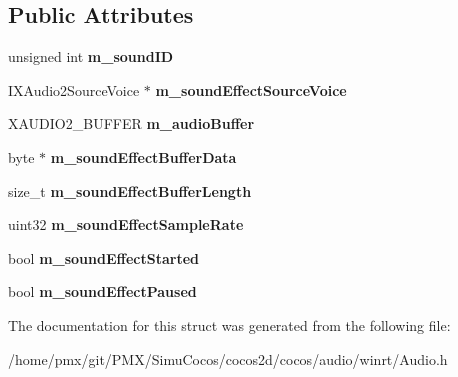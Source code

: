 \subsection*{Public Attributes}
\begin{DoxyCompactItemize}
\item 
\mbox{\label{structSoundEffectData_a1ca36290fb1d20f921a185ddafa4c417}} 
unsigned int {\bfseries m\+\_\+sound\+ID}
\item 
\mbox{\label{structSoundEffectData_ae47aef944a442e08e9ea49ed9feac623}} 
I\+X\+Audio2\+Source\+Voice $\ast$ {\bfseries m\+\_\+sound\+Effect\+Source\+Voice}
\item 
\mbox{\label{structSoundEffectData_ab70a06fe6593dbc7db84555f27c5dcc1}} 
X\+A\+U\+D\+I\+O2\+\_\+\+B\+U\+F\+F\+ER {\bfseries m\+\_\+audio\+Buffer}
\item 
\mbox{\label{structSoundEffectData_a8cd590aef163bdf4feb5b9d29622f5d2}} 
byte $\ast$ {\bfseries m\+\_\+sound\+Effect\+Buffer\+Data}
\item 
\mbox{\label{structSoundEffectData_a3d1b28963669ccfe8423dd8e45963d30}} 
size\+\_\+t {\bfseries m\+\_\+sound\+Effect\+Buffer\+Length}
\item 
\mbox{\label{structSoundEffectData_abb7c6cf13d223a01808b524a8e1965d4}} 
uint32 {\bfseries m\+\_\+sound\+Effect\+Sample\+Rate}
\item 
\mbox{\label{structSoundEffectData_aa95f9ae1a1a3fcd47cc1db9e156184c9}} 
bool {\bfseries m\+\_\+sound\+Effect\+Started}
\item 
\mbox{\label{structSoundEffectData_a2dc78db9bd7574c9573516f3aa3f5104}} 
bool {\bfseries m\+\_\+sound\+Effect\+Paused}
\end{DoxyCompactItemize}


The documentation for this struct was generated from the following file\+:\begin{DoxyCompactItemize}
\item 
/home/pmx/git/\+P\+M\+X/\+Simu\+Cocos/cocos2d/cocos/audio/winrt/Audio.\+h\end{DoxyCompactItemize}
